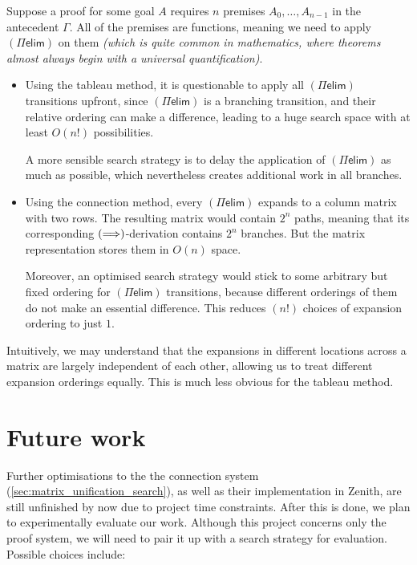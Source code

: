 \documentclass[twoside]{report}
\begin{document}
\begin{example}
Suppose a proof for some goal $A$ requires $n$ premises $A_0, \ldots, A_{n-1}$ in the antecedent $\Gamma$. All of the premises are functions, meaning we need to apply $(\Pi\mathsf{elim})$ on them \emph{(which is quite common in mathematics, where theorems almost always begin with a universal quantification)}.

\begin{itemize}
    \item Using the tableau method, it is questionable to apply all $(\Pi\mathsf{elim})$ transitions upfront, since $(\Pi\mathsf{elim})$ is a branching transition, and their relative ordering can make a difference, leading to a huge search space with at least $O(n!)$ possibilities.
    
    A more sensible search strategy is to delay the application of $(\Pi\mathsf{elim})$ as much as possible, which nevertheless creates additional work in all branches.

    \item Using the connection method, every $(\Pi\mathsf{elim})$ expands to a column matrix with two rows. The resulting matrix would contain $2^n$ paths, meaning that its corresponding $(\Longrightarrow)$-derivation contains $2^n$ branches. But the matrix representation stores them in $O(n)$ space.

    Moreover, an optimised search strategy would stick to some arbitrary but fixed ordering for $(\Pi\mathsf{elim})$ transitions, because different orderings of them do not make an essential difference. This reduces $(n!)$ choices of expansion ordering to just $1$.
\end{itemize}

Intuitively, we may understand that the expansions in different locations across a matrix are largely independent of each other, allowing us to treat different expansion orderings equally. This is much less obvious for the tableau method.
\end{example}

\section{Future work}
\label{sec:evaluation_future_works}

Further optimisations to the the connection system (\cref{sec:matrix_unification_search}), as well as their implementation in Zenith, are still unfinished by now due to project time constraints. After this is done, we plan to experimentally evaluate our work. Although this project concerns only the proof system, we will need to pair it up with a search strategy for evaluation. Possible choices include:
\end{document}
